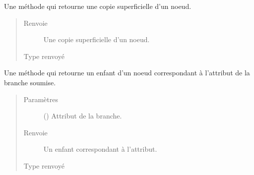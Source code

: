 \documentclass[letterpaper,10pt,french]{sphinxmanual}
\begin{document}
\begin{fulllineitems}
\begin{fulllineitems}
\end{fulllineitems}


\begin{fulllineitems}
\label{\detokenize{index:StrategyTree.Observation.copy}}
Une méthode qui retourne une copie superficielle d’un noeud.
\begin{quote}\begin{description}
\item[{Renvoie}] \leavevmode
{} \textendash{} Une copie superficielle d’un noeud.

\item[{Type renvoyé}] \leavevmode
{\hyperref[\detokenize{index:StrategyTree.Observation}]{}}

\end{description}\end{quote}

\end{fulllineitems}


\begin{fulllineitems}
\label{\detokenize{index:StrategyTree.Observation.get_child_by_attribute}}
Une méthode qui retourne un enfant d’un noeud correspondant à l’attribut de la branche soumise.
\begin{quote}\begin{description}
\item[{Paramètres}] \leavevmode
{} () \textendash{} Attribut de la branche.

\item[{Renvoie}] \leavevmode
{} \textendash{} Un enfant correspondant à l’attribut.

\item[{Type renvoyé}] \leavevmode
{\hyperref[\detokenize{index:StrategyTree.NodeST}]{}}

\end{description}\end{quote}


\end{fulllineitems}
\end{fulllineitems}
\end{document}
